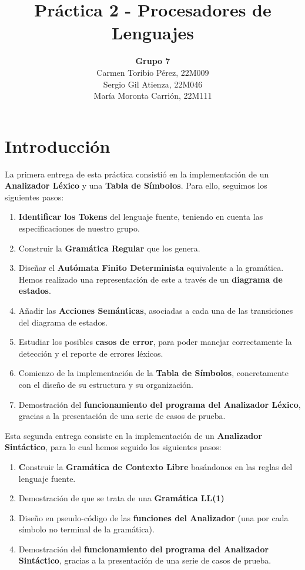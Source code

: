 \documentclass{article}
\title{\textbf{Práctica 2 - Procesadores de Lenguajes}}
\author{\textbf{Grupo 7}\\Carmen Toribio Pérez, 22M009\\Sergio Gil Atienza, 22M046\\María Moronta Carrión, 22M111}
\date{}
\begin{document}
\maketitle

\section*{Introducción}

La primera entrega de esta práctica consistió en la implementación de un \textbf{Analizador Léxico} y una \textbf{Tabla de Símbolos}. Para ello, seguimos los siguientes pasos: 
\begin{enumerate}
    \item \textbf{Identificar los Tokens} del lenguaje fuente, teniendo en cuenta las especificaciones de nuestro grupo.
    \item Construir la \textbf{Gramática Regular} que los genera.
    \item Diseñar el \textbf{Autómata Finito Determinista} equivalente a la gramática. Hemos realizado una representación de este a través de un \textbf{diagrama de estados}.
    \item Añadir las \textbf{Acciones Semánticas}, asociadas a cada una de las transiciones del diagrama de estados.
    \item Estudiar los posibles \textbf{casos de error}, para poder manejar correctamente la detección y el reporte de errores léxicos. 
    \item Comienzo de la implementación de la \textbf{Tabla de Símbolos}, concretamente con el diseño de su estructura y su organización.
    \item Demostración del \textbf{funcionamiento del programa del Analizador Léxico}, gracias a la presentación de una serie de casos de prueba.
\end{enumerate}
 
Esta segunda entrega consiste en la implementación de un \textbf{Analizador Sintáctico}, para lo cual hemos seguido los siguientes pasos:

\begin{enumerate}
    \item \textbf Construir la \textbf{Gramática de Contexto Libre} basándonos en las reglas del lenguaje fuente.
    \item Demostración de que se trata de una \textbf{Gramática LL(1)}
    \item Diseño en pseudo-código de las \textbf{funciones del Analizador} (una por cada símbolo no terminal de la gramática).
    \item Demostración del \textbf{funcionamiento del programa del Analizador Sintáctico}, gracias a la presentación de una serie de casos de prueba.
\end{enumerate}
\end{document}
